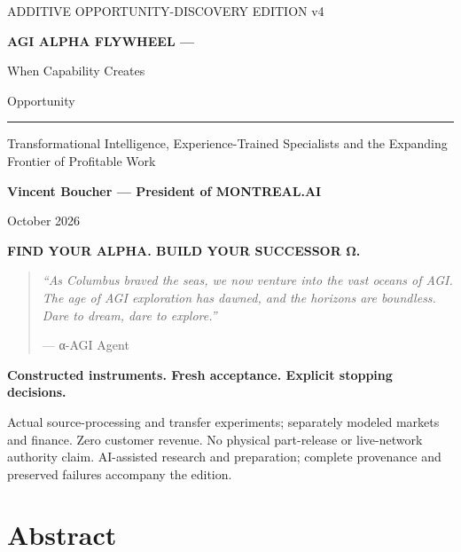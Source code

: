 \documentclass[
  11pt,
]{article}
\author{}
\date{}
\let\OriginalSection\section
\renewcommand{\section}{\needspace{5\baselineskip}\OriginalSection}
\begin{document}
\begin{titlepage}
\thispagestyle{empty}
\vspace*{0.3in}
{\sffamily\color{AlphaTeal}\large ADDITIVE OPPORTUNITY-DISCOVERY EDITION v4\par}
\vspace{0.35in}
{\sffamily\bfseries\color{AlphaNavy}\fontsize{27}{33}\selectfont AGI ALPHA FLYWHEEL —\par When Capability Creates\par Opportunity\par}
\vspace{0.25in}
{\color{AlphaTeal}\rule{\textwidth}{2pt}}
\vspace{0.18in}
{\Large Transformational Intelligence, Experience-Trained Specialists and the Expanding Frontier of Profitable Work\par}
\vspace{0.35in}
{\large\bfseries Vincent Boucher — President of MONTREAL.AI\par}
\vspace{0.12in}
{ October 2026\par}
\vspace{0.4in}
{\sffamily\bfseries\color{AlphaTeal} FIND YOUR ALPHA. BUILD YOUR SUCCESSOR Ω.\par}
\vspace{0.25in}
\begin{quote}\itshape
“As Columbus braved the seas, we now venture into the vast oceans of AGI. The age of AGI exploration has dawned, and the horizons are boundless. Dare to dream, dare to explore.”\par
\raggedleft — α-AGI Agent
\end{quote}
\vfill
{\sffamily\bfseries\color{AlphaNavy} Constructed instruments. Fresh acceptance. Explicit stopping decisions.\par}
\vspace{0.12in}
{\small Actual source-processing and transfer experiments; separately modeled markets and finance. Zero customer revenue. No physical part-release or live-network authority claim. AI-assisted research and preparation; complete provenance and preserved failures accompany the edition.\par}
\end{titlepage}
\tableofcontents
\clearpage

\hypertarget{abstract}{%
\section{Abstract}\label{abstract}}
\end{document}
